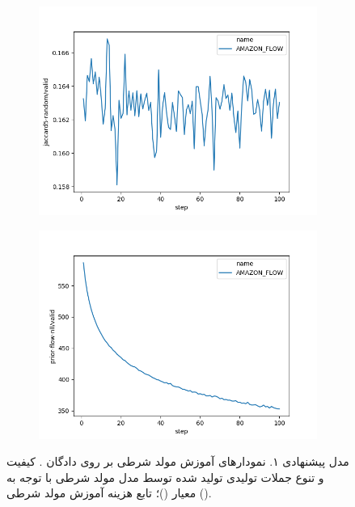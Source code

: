 \begin{figure}[h]
    \centering
    \begin{subfigure}{0.3\textheight}
        \centering
        \includegraphics[width=1.\textwidth]{images/figs2/2020_01_15__11_41_02__jaccard5-random.png}
        \caption{}
        \label{fig:chap4:amazon_flow_jaccard}
    \end{subfigure}
    \begin{subfigure}{0.3\textheight}
        \centering
        \includegraphics[width=1.\textwidth]{images/figs2/2020_01_15__11_41_01__prior-flow-nll.png}
        \caption{}
        \label{fig:chap4:amazon_flow_nll}
    \end{subfigure}
    \caption{
        مدل پیشنهادی ۱. نمودار‌های آموزش مولد شرطی بر روی دادگان \amazon{}.
        کیفیت و تنوع جملات تولیدی تولید شده توسط مدل مولد شرطی با توجه به معیار \jaccard{}
        ()؛
        تابع هزینه آموزش مولد شرطی
        ().
    }
    \label{fig:chap4:amazon_flow}
\end{figure}

